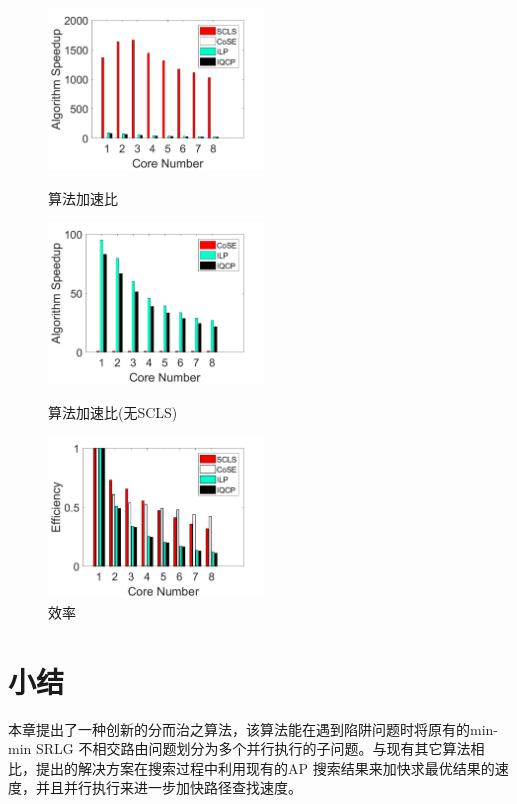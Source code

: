 \begin{figure}[htbp]
\centering
\begin{minipage}[t]{0.3\linewidth}
\centering
\includegraphics[width=2.25in]{figures/Multiple}
\caption{算法加速比}
\label{fig:Multiple}
\end{minipage}
\hfill
\begin{minipage}[t]{0.3\linewidth}
\centering
\includegraphics[width=2.25in]{figures/MultipleNoSCLS}
\caption{算法加速比(无SCLS)}
\label{fig:MultipleNoSCLS}
\end{minipage}
\hfill
\begin{minipage}[t]{0.3\linewidth}
\centering
\includegraphics[width=2.25in]{figures/Efficiency}
 \caption{效率}
 \label{fig:Efficiency}
\end{minipage}
\end{figure}
\section{小结}
本章提出了一种创新的分而治之算法，该算法能在遇到陷阱问题时将原有的min-min SRLG 不相交路由问题划分为多个并行执行的子问题。与现有其它算法相比，提出的解决方案在搜索过程中利用现有的AP 搜索结果来加快求最优结果的速度，并且并行执行来进一步加快路径查找速度。

